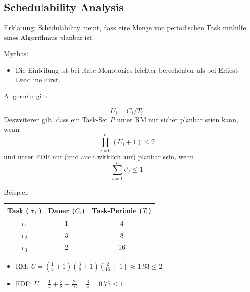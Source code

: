 

\subsection{Schedulability Analysis}\label{SchedulabilityAnalaysis}
\begin{frame}{Erklärung:}
	Schedulability meint, dass eine Menge von periodischen Task mithilfe eines Algorithmus planbar ist.
\end{frame}
\begin{frame}{Mythos:}
	\begin{itemize}
		\item Die Einteilung ist bei Rate Monotonics leichter berechenbar als bei Erliest Deadline First.
	\end{itemize}
\end{frame}

\begin{frame}{Allgemein gilt:}
	
	\begin{equation}
		U_i = C_i / T_i
	\end{equation}
	Desweiteren gilt, dass ein Task-Set $P$ unter RM nur sicher planbar seien kann, wenn
	\begin{equation}
		\prod_{i=0}^n (U_i +1) \leq 2
	\end{equation}
	und unter EDF nur (und auch wirklich nur) planbar sein, wenn
	\begin{equation}
		\sum_{i=1}^n U_i \leq 1
	\end{equation}
\end{frame}

\begin{frame}{Beispiel:}
	\begin{center}
		\begin{tabular}{c||c|c}
			Task ($\uptau_i$) & Dauer ($C_i$) & Task-Periode ($T_i$)\\\hline\hline
			$\uptau_1$ & 1 & 4\\
			$\uptau_2$ & 3 & 8\\
			$\uptau_3$ & 2 & 16
		\end{tabular}	
		\begin{itemize}
			\item RM: $U = (\frac{1}{4}+1)(\frac{3}{8}+1)(\frac{2}{16}+1)\approx 1.93 \leq 2$
			\item EDF: $U = \frac{1}{4} + \frac{3}{8} + \frac{2}{16} = \frac{3}{4} = 0.75 \leq 1$
		\end{itemize}
	\end{center}

\end{frame}

